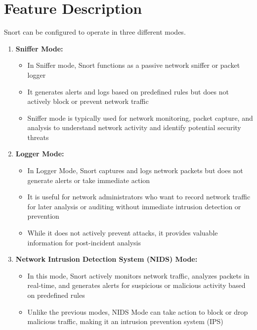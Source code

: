 \documentclass[12pt, A4Paper]{article}
\begin{document}
\section{Feature Description}
Snort can be configured to operate in three different modes.

\begin{enumerate}
    \item \textbf{Sniffer Mode:}
    \begin{itemize}
        \item In Sniffer mode, Snort functions as a passive network sniffer or packet logger
        \item It generates alerts and logs based on predefined rules but does not actively block or prevent network traffic
        \item Sniffer mode is typically used for network monitoring, packet capture, and analysis to understand network activity and identify potential security threats
    \end{itemize}

    \item \textbf{Logger Mode:}
    \begin{itemize}
        \item In Logger Mode, Snort captures and logs network packets but does not generate alerts or take immediate action
        \item It is useful for network administrators who want to record network traffic for later analysis or auditing without immediate intrusion detection or prevention
        \item While it does not actively prevent attacks, it provides valuable information for post-incident analysis
    \end{itemize}

    \item \textbf{Network Intrusion Detection System (NIDS) Mode:}
    \begin{itemize}
        \item In this mode, Snort actively monitors network traffic, analyzes packets in real-time, and generates alerts for suspicious or malicious activity based on predefined rules
        \item Unlike the previous modes, NIDS Mode can take action to block or drop malicious traffic, making it an intrusion prevention system (IPS)
    \end{itemize}
\end{enumerate}
\vspace{2.5cm}
\end{document}
